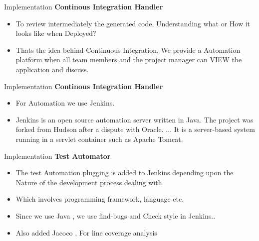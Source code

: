 \documentclass{beamer}
\begin{document}
\begin{frame}{Implementation}
	\textbf{Continous Integration Handler}
	\begin{itemize}
		
		\item To review intermediately the generated code, Understanding what or How it looks like when Deployed?
		\vspace{0.05cm}
		\item Thats the idea behind Continuous Integration, We provide a Automation platform when all team members and the project manager can VIEW the application and discuss.
		  
		
	\end{itemize}	
\end{frame}


\begin{frame}{Implementation}
	\textbf{Continous Integration Handler}
	\begin{itemize}
		
		\item For Automation we use Jenkins.
		\vspace{0.05cm}
		
		\item Jenkins is an open source automation server written in Java. The project was forked from Hudson after a dispute with Oracle. ... It is a server-based system running in a servlet container such as Apache Tomcat.
		
		
	\end{itemize}	
\end{frame}


\begin{frame}{Implementation}
	\textbf{Test Automator}
	\begin{itemize}
		
		\item The test Automation plugging is added to Jenkins depending upon the Nature of the development process dealing with.
		\vspace{0.05cm}
		
		\item Which involves programming framework, language etc.
		\vspace{0.05cm}
		\item Since we use Java , we use find-bugs and Check style in Jenkins..
		\vspace{0.05cm}
		\item Also added Jacoco , For line coverage analysis
		
		
	\end{itemize}	
\end{frame}
\end{document}
